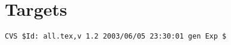 \chapter{Targets}
\graphicspath{{targets/figs/}}
\renewcommand{\dirfig}[0]{targets/figs}
\renewcommand{\dircur}[0]{targets}


\newpage

\newpage

\newpage


%
%
{\small
\begin{verbatim}CVS $Id: all.tex,v 1.2 2003/06/05 23:30:01 gen Exp $\end{verbatim}
}
